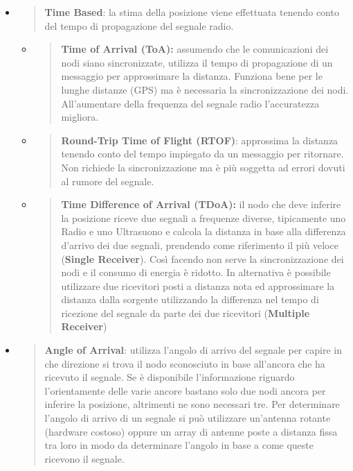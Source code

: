 \begin{itemize}
\item
  \begin{quote}
  \textbf{Time Based}: la stima della posizione viene effettuata tenendo
  conto del tempo di propagazione del segnale radio.
  \end{quote}

  \begin{itemize}
  \item
    \begin{quote}
    \textbf{Time of Arrival (ToA):} assumendo che le comunicazioni dei
    nodi siano sincronizzate, utilizza il tempo di propagazione di un
    messaggio per approssimare la distanza. Funziona bene per le lunghe
    distanze (GPS) ma è necessaria la sincronizzazione dei nodi.
    All'aumentare della frequenza del segnale radio l'accuratezza
    migliora.
    \end{quote}
  \item
    \begin{quote}
    \textbf{Round-Trip Time of Flight (RTOF)}: approssima la distanza
    tenendo conto del tempo impiegato da un messaggio per ritornare. Non
    richiede la sincronizzazione ma è più soggetta ad errori dovuti al
    rumore del segnale.
    \end{quote}
  \item
    \begin{quote}
    \textbf{Time Difference of Arrival (TDoA):} il nodo che deve
    inferire la posizione riceve due segnali a frequenze diverse,
    tipicamente uno Radio e uno Ultrasuono e calcola la distanza in base
    alla differenza d'arrivo dei due segnali, prendendo come riferimento
    il più veloce (\textbf{Single Receiver}). Così facendo non serve la
    sincronizzazione dei nodi e il consumo di energia è ridotto. In
    alternativa è possibile utilizzare due ricevitori posti a distanza
    nota ed approssimare la distanza dalla sorgente utilizzando la
    differenza nel tempo di ricezione del segnale da parte dei due
    ricevitori (\textbf{Multiple Receiver})
    \end{quote}
  \end{itemize}
\item
  \begin{quote}
  \textbf{Angle of Arrival}: utilizza l'angolo di arrivo del segnale per
  capire in che direzione si trova il nodo sconosciuto in base
  all'ancora che ha ricevuto il segnale. Se è disponibile l'informazione
  riguardo l'orientamente delle varie ancore bastano solo due nodi
  ancora per inferire la posizione, altrimenti ne sono necessari tre.
  Per determinare l'angolo di arrivo di un segnale si può utilizzare
  un'antenna rotante (hardware costoso) oppure un array di antenne poste
  a distanza fissa tra loro in modo da determinare l'angolo in base a
  come queste ricevono il segnale.
  \end{quote}
\end{itemize}


